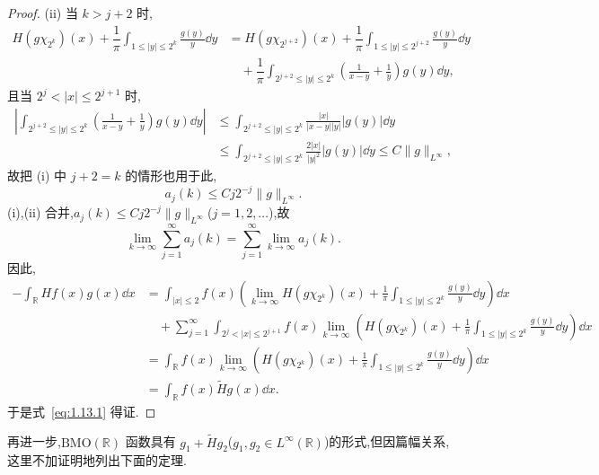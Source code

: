 \begin{proof}
(ii) 当 $k > j + 2$ 时,
\begin{align*}
H(g\chi_{2^{k}})(x) + \dfrac{1}{\pi}\displaystyle\int_{1 \leq |y| \leq 2^{k}}\frac{g(y)}{y}\dd y & = H(g\chi_{2^{j+2}})(x) + \dfrac{1}{\pi}\int_{1 \leq |y| \leq 2^{j+2}}\frac{g(y)}{y}\dd y \\
& \quad + \dfrac{1}{\pi}\displaystyle\int_{2^{j+2} \leq |y| \leq 2^{k}}\left(\frac{1}{x - y} + \frac{1}{y}\right)g(y)\dd y,
\end{align*}
且当 $2^{j} < |x| \leq 2^{j+1}$ 时,
\begin{align*}
\left|\displaystyle\int_{2^{j+2} \leq |y| \leq 2^{k}}\left(\frac{1}{x - y} + \frac{1}{y}\right)g(y)\dd y\right| & \leq \int_{2^{j+2} \leq |y| \leq 2^{k}}\frac{|x|}{|x - y||y|}|g(y)|\dd y \\
& \leq \displaystyle\int_{2^{j+2} \leq |y| \leq 2^{k}}\frac{2|x|}{|y|^{2}}|g(y)|\dd y \leq C\| g \|_{L^{\infty}},
\end{align*}
故把 (i) 中 $j + 2 = k$ 的情形也用于此,
\begin{equation*}
a_{j}(k) \leq Cj2^{-j}\| g \|_{L^{\infty}}.
\end{equation*}
(i),(ii) 合并,$a_{j}(k) \leq Cj2^{-j}\| g \|_{L^{\infty}}$($j = 1, 2, \ldots$),故
\begin{equation*}
\lim_{k \to \infty}\sum_{j=1}^{\infty}a_{j}(k) = \sum_{j=1}^{\infty}\lim_{k \to \infty}a_{j}(k).
\end{equation*}
因此,
\begin{align*}
-\displaystyle\int_{\mathbb{R}}Hf(x)g(x)\dd x&= \displaystyle\int_{|x| \leq 2}f(x)\left(\lim_{k \to \infty}H(g\chi_{2^{k}})(x) + \frac{1}{\pi}\int_{1 \leq |y| \leq 2^{k}}\frac{g(y)}{y}\dd y\right)\dd x  \\
&\quad + \displaystyle\sum_{j=1}^{\infty}\int_{2^{j} < |x| \leq 2^{j+1}}f(x)\lim_{k \to \infty}\left(H(g\chi_{2^{k}})(x) + \frac{1}{\pi}\int_{1 \leq |y| \leq 2^{k}}\frac{g(y)}{y}\dd y\right)\dd x \\
&= \displaystyle\int_{\mathbb{R}}f(x)\lim_{k \to \infty}\left(H(g\chi_{2^{k}})(x) + \frac{1}{\pi}\int_{1 \leq |y| \leq 2^{k}}\frac{g(y)}{y}\dd y\right)\dd x \\
&= \displaystyle\int_{\mathbb{R}}f(x)\tilde{H}g(x)\dd x.
\end{align*}
于是式~\eqref{eq:1.13.1} 得证.
\end{proof}

再进一步,$\mathrm{BMO}(\mathbb{R})$ 函数具有 $g_{1} + \tilde{H}g_{2}$($g_{1}, g_{2} \in L^{\infty}(\mathbb{R})$)的形式,但因篇幅关系,这里不加证明地列出下面的定理.

